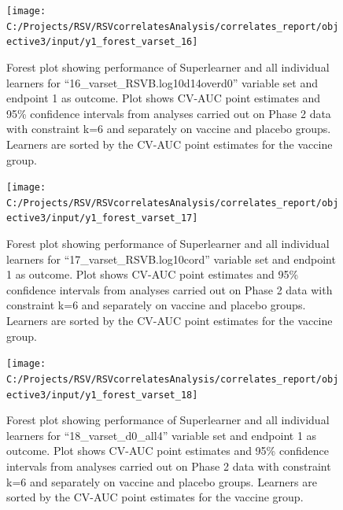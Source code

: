 \documentclass[11pt]{article}
\begin{document}
\begin{figure}[H]

{\centering \texttt{[image: C:/Projects/RSV/RSVcorrelatesAnalysis/correlates\_report/objective3/input/y1\_forest\_varset\_16]} 

}

\caption[Forest plot for ``16\_varset\_RSVB.log10d14overd0'' variable set, endpoint 1.]{Forest plot showing performance of Superlearner and all individual learners for ``16\_varset\_RSVB.log10d14overd0'' variable set and endpoint 1 as outcome. Plot shows CV-AUC point estimates and 95\% confidence intervals from analyses carried out on Phase 2 data with constraint k=6 and separately on vaccine and placebo groups. Learners are sorted by the CV-AUC point estimates for the vaccine group.}\label{fig:y1-forest-varset-16}
\end{figure}

\begin{figure}[H]

{\centering \texttt{[image: C:/Projects/RSV/RSVcorrelatesAnalysis/correlates\_report/objective3/input/y1\_forest\_varset\_17]} 

}

\caption[Forest plot for ``17\_varset\_RSVB.log10cord'' variable set, endpoint 1.]{Forest plot showing performance of Superlearner and all individual learners for ``17\_varset\_RSVB.log10cord'' variable set and endpoint 1 as outcome. Plot shows CV-AUC point estimates and 95\% confidence intervals from analyses carried out on Phase 2 data with constraint k=6 and separately on vaccine and placebo groups. Learners are sorted by the CV-AUC point estimates for the vaccine group.}\label{fig:y1-forest-varset-17}
\end{figure}

\begin{figure}[H]

{\centering \texttt{[image: C:/Projects/RSV/RSVcorrelatesAnalysis/correlates\_report/objective3/input/y1\_forest\_varset\_18]} 

}

\caption[Forest plot for ``18\_varset\_d0\_all4'' variable set, endpoint 1.]{Forest plot showing performance of Superlearner and all individual learners for ``18\_varset\_d0\_all4'' variable set and endpoint 1 as outcome. Plot shows CV-AUC point estimates and 95\% confidence intervals from analyses carried out on Phase 2 data with constraint k=6 and separately on vaccine and placebo groups. Learners are sorted by the CV-AUC point estimates for the vaccine group.}\label{fig:y1-forest-varset-18}
\end{figure}
\end{document}

